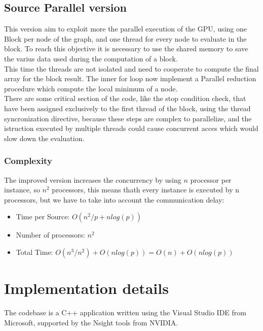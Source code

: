 \documentclass[
	a4paper, %
	12pt, %
]{class}
\begin{document}
\subsection{Source Parallel version}
This version aim to exploit more the parallel execution of the GPU, using one Block per node of the graph, and one thread for every node to evaluate in the block.
To reach this objective it is necessary to use the shared memory to save the varius data used during the computation of a block.\\

This time the threads are not isolated and need to cooperate to compute the final array for the block result.
The inner for loop now implement a Parallel reduction procedure which compute the local minimum of a node.\\

There are some critical section of the code, like the stop condition check, that have been assigned exclusively to the first thread of the block,
using the thread syncronization directive, because these steps are complex to parallelize, and the istruction executed by multiple threads could
cause concurrent acces which would slow down the evaluation.

\subsubsection{Complexity}
The improved version increases the concurrency by using $n$ processor per instance, so $n^2$ processors, this means thath every instance is executed
by n processors, but we have to take into account the communication delay:\\
\begin{itemize}
    \item Time per Source: $O(n^2/p + nlog(p))$
    \item Number of processors: $n^2$
    \item Total Time: $O(n^3 / n^2) + O(nlog(p)) = O(n) + O(nlog(p))$\\
\end{itemize}

\newpage
\section{Implementation details}

The codebase is a C++ application written using the Visual Studio IDE from Microsoft, supported by the Nsight tools from NVIDIA. \cite{nsight}
\end{document}
